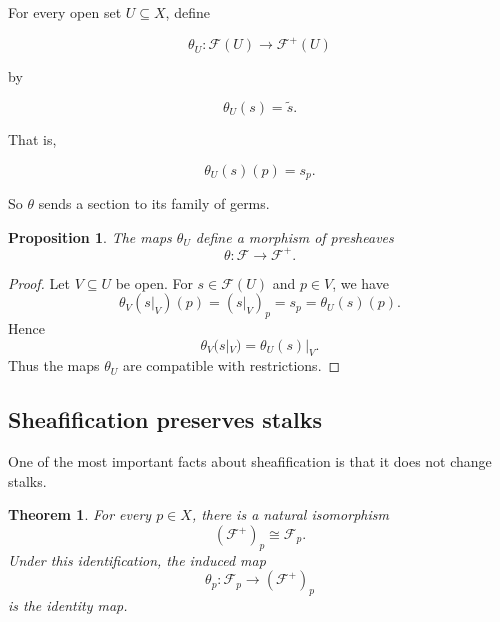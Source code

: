 \documentclass[12pt,a4paper]{article}
\newtheorem{theorem}{Theorem}[section]
\newtheorem{proposition}{Proposition}[section]
\begin{document}
For every open set $U \subseteq X$, define

\[
\theta_U : \mathcal F(U) \longrightarrow \mathcal F^+(U)
\]

by

\[
\theta_U(s)=\widetilde{s}.
\]

That is,

\[
\theta_U(s)(p)=s_p.
\]

So $\theta$ sends a section to its family of germs.

\begin{proposition}
	The maps $\theta_U$ define a morphism of presheaves
	\[
	\theta : \mathcal F \longrightarrow \mathcal F^+.
	\]
\end{proposition}

\begin{proof}
	Let $V \subseteq U$ be open.
	For $s \in \mathcal F(U)$ and $p \in V$, we have
	\[
	\theta_V(s|_V)(p)
	=
	(s|_V)_p
	=
	s_p
	=
	\theta_U(s)(p).
	\]
	Hence
	\[
	\theta_V(s|_V)=\theta_U(s)|_V.
	\]
	Thus the maps $\theta_U$ are compatible with restrictions.
\end{proof}

\subsection{Sheafification preserves stalks}

One of the most important facts about sheafification is that it does not change
stalks.

\begin{theorem}
	For every $p \in X$, there is a natural isomorphism
	\[
	(\mathcal F^+)_p \cong \mathcal F_p.
	\]
	Under this identification, the induced map
	\[
	\theta_p : \mathcal F_p \longrightarrow (\mathcal F^+)_p
	\]
	is the identity map.
\end{theorem}
\end{document}
